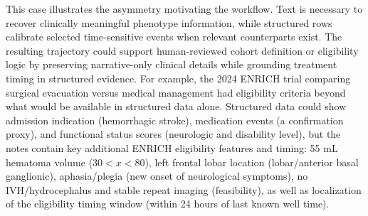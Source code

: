 \textbf{}This case illustrates the asymmetry motivating the workflow. Text is necessary to recover clinically meaningful phenotype information, while structured rows calibrate selected time-sensitive events when relevant counterparts exist. The resulting trajectory could support human-reviewed cohort definition or eligibility logic by preserving narrative-only clinical details while grounding treatment timing in structured evidence. 
For example, the 2024 ENRICH trial comparing surgical evacuation versus medical management had eligibility criteria beyond what would be available in structured data alone\cite{pradilla2024trial}. 
Structured data could show admission indication (hemorrhagic stroke), medication events (a confirmation proxy), and functional status scores (neurologic and disability level), but the notes contain key additional ENRICH eligibility features and timing: 55 mL hematoma volume ($30<x<80$), left frontal lobar location (lobar/anterior basal ganglionic), aphasia/plegia (new onset of neurological symptoms), no IVH/hydrocephalus and stable repeat imaging (feasibility), as well as localization of the eligibility timing window (within 24 hours of last known well time).


